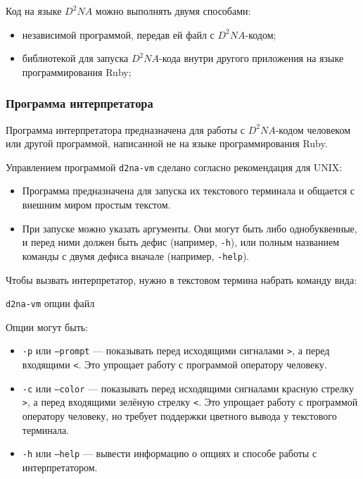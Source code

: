 \documentclass[utf8,a5paper,portrait,10pt]{eskdtext}
\begin{document}
Код на языке $D^2NA$ можно выполнять двумя способами:
\begin{itemize}
  \item независимой программой, передав ей файл с $D^2NA$-кодом;
  \item библиотекой для запуска $D^2NA$-кода внутри другого приложения на языке
        программирования Ruby;
\end{itemize}

\subsubsection{Программа интерпретатора}

Программа интерпретатора предназначена для работы с $D^2NA$-кодом человеком или
другой программой, написанной не на языке программирования Ruby.

Управлением программой \texttt{d2na-vm} сделано согласно рекомендация для
UNIX:
\begin{itemize}
  \item Программа предназначена для запуска их текстового терминала и общается
        с внешним миром простым текстом.
  \item При запуске можно указать аргументы. Они могут быть либо однобуквенные,
        и перед ними должен быть дефис (например, \texttt{-h}), или полным
        названием команды с двумя дефиса вначале (например, \texttt{-help}).
\end{itemize}

\newpage
Чтобы вызвать интерпретатор, нужно в текстовом термина набрать команду вида:

\texttt{d2na-vm} опции файл

Опции могут быть:

\begin{itemize}
  \item \texttt{-p} или \texttt{--prompt} — показывать перед исходящими
        сигналами \texttt{>}, а перед входящими \texttt{<}. Это упрощает работу
        с программой оператору человеку.
  \item \texttt{-c} или \texttt{--color} — показывать перед исходящими
        сигналами красную стрелку \texttt{>}, а перед входящими зелёную стрелку
        \texttt{<}. Это упрощает работу с программой оператору человеку, но
        требует поддержки цветного вывода у текстового терминала.
  \item \texttt{-h} или \texttt{--help} — вывести информацию о опциях и способе
        работы с интерпретатором.
\end{itemize}
\end{document}
